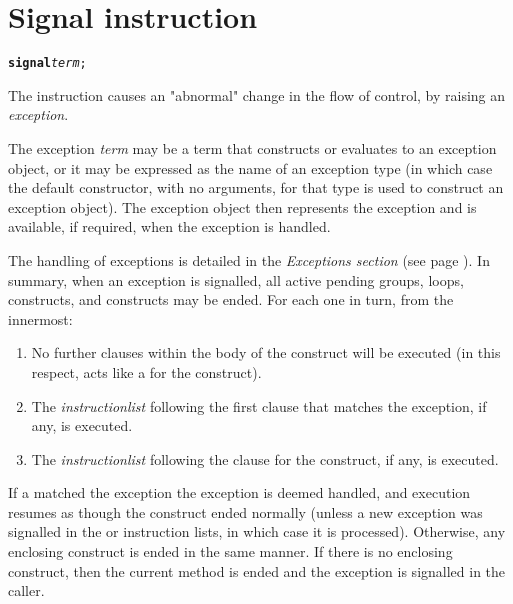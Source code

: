 \chapter{Signal instruction}\label{refsignal}
\index{,}
\index{,}
\begin{shaded}
\begin{alltt}
\textbf{signal} \emph{term};
\end{alltt}
\end{shaded}
 The  instruction causes an "abnormal" change
in the flow of control, by raising an \emph{exception}.
 
The exception \emph{term} may be a term that constructs or evaluates
to an exception object, or it may be expressed as the name of an
exception type (in which case the default constructor, with no
arguments, for that type is used to construct an exception object).
The exception object then represents the exception and is available, if
required, when the exception is handled.
 
The handling of exceptions is detailed in the
 \emph{Exceptions section} (see page \pageref{refexcep}).
In summary, when an exception is signalled, all active pending
 groups,  loops,  constructs, and
 constructs may be ended.
For each one in turn, from the innermost:
\begin{enumerate}
\item No further clauses within the body of the construct will be executed
(in this respect,  acts like a  for the
construct).
\item The \emph{instructionlist} following the first 
clause that matches the exception, if any, is executed.
\item The \emph{instructionlist} following the 
clause for the construct, if any, is executed.
\end{enumerate}
If a  matched the exception the exception is deemed
handled, and execution resumes as though the construct ended normally
(unless a new exception was signalled in the  or
 instruction lists, in which case it is processed).
Otherwise, any enclosing construct is ended in the same manner.
If there is no enclosing construct, then the current method is ended and
the exception is signalled in the caller.
 

